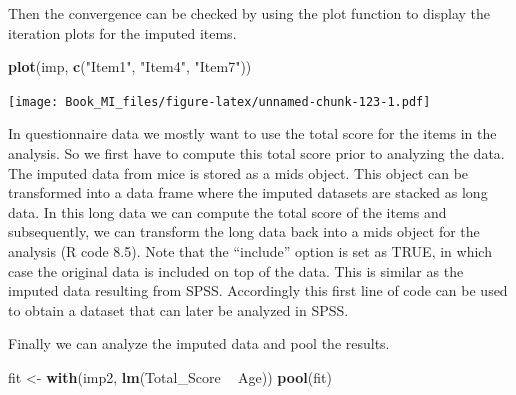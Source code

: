 \documentclass[
]{book}
\newenvironment{Shaded}{\begin{snugshade}}{\end{snugshade}}
\newcommand{\DataTypeTok}[1]{\textcolor[rgb]{0.13,0.29,0.53}{#1}}
\newcommand{\DecValTok}[1]{\textcolor[rgb]{0.00,0.00,0.81}{#1}}
\newcommand{\KeywordTok}[1]{\textcolor[rgb]{0.13,0.29,0.53}{\textbf{#1}}}
\newcommand{\NormalTok}[1]{#1}
\newcommand{\OperatorTok}[1]{\textcolor[rgb]{0.81,0.36,0.00}{\textbf{#1}}}
\newcommand{\OtherTok}[1]{\textcolor[rgb]{0.56,0.35,0.01}{#1}}
\newcommand{\StringTok}[1]{\textcolor[rgb]{0.31,0.60,0.02}{#1}}
\begin{document}
Then the convergence can be checked by using the plot function to
display the iteration plots for the imputed items.

\begin{Shaded}
\begin{Highlighting}[]
\KeywordTok{plot}\NormalTok{(imp, }\KeywordTok{c}\NormalTok{(}\StringTok{"Item1"}\NormalTok{, }\StringTok{"Item4"}\NormalTok{, }\StringTok{"Item7"}\NormalTok{))}
\end{Highlighting}
\end{Shaded}

\texttt{[image: Book\_MI\_files/figure-latex/unnamed-chunk-123-1.pdf]}

In questionnaire data we mostly want to use the total score for the
items in the analysis. So we first have to compute this total score
prior to analyzing the data. The imputed data from mice is stored as a
mids object. This object can be transformed into a data frame where the
imputed datasets are stacked as long data. In this long data we can
compute the total score of the items and subsequently, we can transform
the long data back into a mids object for the analysis (R code 8.5).
Note that the ``include'' option is set as TRUE, in which case the
original data is included on top of the data. This is similar as the
imputed data resulting from SPSS. Accordingly this first line of code
can be used to obtain a dataset that can later be analyzed in SPSS.

\begin{Shaded}
\end{Shaded}

Finally we can analyze the imputed data and pool the results.

\begin{Shaded}
\begin{Highlighting}[]
\NormalTok{fit <-}\StringTok{ }\KeywordTok{with}\NormalTok{(imp2, }\KeywordTok{lm}\NormalTok{(Total_Score }\OperatorTok{~}\StringTok{ }\NormalTok{Age))}
\KeywordTok{pool}\NormalTok{(fit)}
\end{Highlighting}
\end{Shaded}
\end{document}

